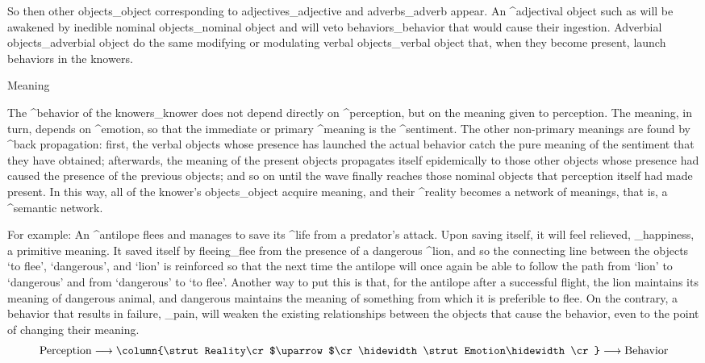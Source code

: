 So then other objects_{object} corresponding to adjectives_{adjective}
and adverbs_{adverb} appear. An ^{adjectival object} such as
 will be awakened by inedible nominal
objects_{nominal object} and will veto behaviors_{behavior} that would
cause their ingestion. Adverbial objects_{adverbial object} do the same
modifying or modulating verbal objects_{verbal object} that, when they
become present, launch behaviors in the knowers.


\Section Meaning

The ^{behavior} of the knowers_{knower} does not depend directly on
^{perception}, but on the meaning given to perception. The meaning, in
turn, depends on ^{emotion}, so that the immediate or primary ^{meaning}
is the ^{sentiment}. The other non-primary meanings are found by ^{back
propagation}: first, the verbal objects whose presence has launched the
actual behavior catch the pure meaning of the sentiment that they have
obtained; afterwards, the meaning of the present objects propagates
itself epidemically to those other objects whose presence had caused the
presence of the previous objects; and so on until the wave finally
reaches those nominal objects that perception itself had made present.
In this way, all of the knower's objects_{object} acquire meaning, and
their ^{reality} becomes a network of meanings, that is, a ^{semantic
network}.


For example: An ^{antilope} flees and manages to save its ^{life} from a
predator's attack. Upon saving itself, it will feel relieved,
_{happiness}, a primitive meaning. It saved itself by
fleeing_{flee} from the presence of a dangerous ^{lion}, and so the
connecting line between the objects `to flee', `dangerous', and `lion'
is reinforced so that the next time the antilope will once again be able
to follow the path from `lion' to `dangerous' and from `dangerous' to
`to flee'. Another way to put this is that, for the antilope after a
successful flight, the lion maintains its meaning of dangerous animal,
and dangerous maintains the meaning of something from which it is
preferible to flee. On the contrary, a behavior that results in failure,
_{pain}, will weaken the existing relationships between
the objects that cause the behavior, even to the point of changing their
meaning.
$$\hbox{Perception}\longrightarrow
  \column{\strut Reality\cr
               $\uparrow$\cr
  \hidewidth\strut Emotion\hidewidth\cr}
  \longrightarrow\hbox{Behavior}$$

